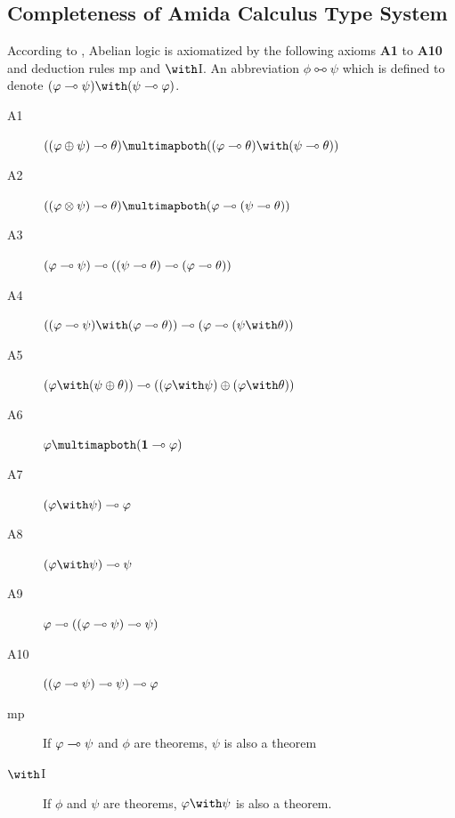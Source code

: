 \subsection{Completeness of Amida Calculus Type System}

According to \citet{metcalfe2002}, Abelian logic is axiomatized by the
following axioms \textbf{A1} to \textbf{A10} and deduction rules mp and $\with$I.  An abbreviation $\phi
\multimapboth \psi$ which is defined to denote $(\phi\limp \psi)\with (\psi\limp\phi)$.
\begin{description}
 \item[A1] $((\phi\oplus\psi)\limp\theta)\multimapboth
      ((\phi\limp\theta)\with(\psi\limp\theta))$
 \item[A2]
      $((\phi\otimes\psi)\limp\theta)\multimapboth(\phi\limp(\psi\limp\theta))$
 \item[A3]
      $(\varphi\multimap\psi)\multimap((\psi\multimap\theta)\multimap(\varphi\multimap\theta))$
 \item[A4]
      $((\phi\limp\psi)\with(\phi\limp\theta))\limp(\phi\limp(\psi\with\theta))$
 \item[A5]
      $(\phi\with(\psi\oplus\theta))\limp ((\phi\with\psi)\oplus
      (\phi\with\theta))$
 \item[A6]
      $\phi\multimapboth (\one\limp\phi)$
 \item[A7]
      $(\phi\with\psi)\limp\phi$
 \item[A8]
      $(\phi\with\psi)\limp\psi$
 \item[A9]
      $\varphi\multimap((\varphi\multimap\psi)\multimap\psi)$
 \item[A10]
      $((\varphi\multimap\psi)\multimap\psi)\multimap\varphi$
 \item[mp]
      If $\varphi\multimap\psi$ and $\phi$ are theorems, $\psi$ is also a
      theorem
 \item[$\with$I] If $\phi$ and $\psi$ are theorems, $\phi\with\psi$ is
      also a theorem.
\end{description}

